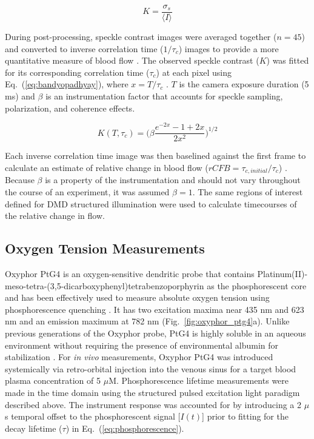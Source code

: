 \documentclass[12pt]{spieman}  %
\begin{document}
\begin{spacing}{2}
\begin{equation}
    \label{eq:speckle_contrast}
    K = \frac{\sigma_{s}}{\langle{I}\rangle}
\end{equation}

During post-processing, speckle contrast images were averaged together ($n = 45$) and converted to inverse correlation time ($1 / \tau_c$) images to provide a more quantitative measure of blood flow \cite{Briers:2001hy}. The observed speckle contrast ($K$) was fitted for its corresponding correlation time ($\tau_{c}$) at each pixel using Eq.~(\ref{eq:bandyopadhyay}), where $x = T / \tau_c$ \cite{Bandyopadhyay:2005bg}. $T$ is the camera exposure duration (5 ms) and $\beta$ is an instrumentation factor that accounts for speckle sampling, polarization, and coherence effects.

\begin{equation}
    \label{eq:bandyopadhyay}
    K(T,\tau_{c}) = \bigg(\beta \frac{e^{-2x} - 1 + 2x}{2x^{2}}\bigg)^{1/2}
\end{equation}

Each inverse correlation time image was then baselined against the first frame to calculate an estimate of relative change in blood flow ($rCFB = \tau_{c,initial}/\tau_c$) \cite{Kazmi:2015du}. Because $\beta$ is a property of the instrumentation and should not vary throughout the course of an experiment, it was assumed $\beta = 1$. The same regions of interest defined for DMD structured illumination were used to calculate timecourses of the relative change in flow.


\subsection{Oxygen Tension Measurements}
Oxyphor PtG4 is an oxygen-sensitive dendritic probe that contains Platinum(II)-meso-tetra-(3,5-dicarboxyphenyl)tetrabenzoporphyrin as the phosphorescent core \cite{Lebedev:2009cf,Esipova:2011hi} and has been effectively used to measure absolute oxygen tension using phosphorescence quenching \cite{Zhang:2013cd,Holt:2014cy}. It has two excitation maxima near 435 nm and 623 nm and an emission maximum at 782 nm (Fig.~\ref{fig:oxyphor_ptg4}a). Unlike previous generations of the Oxyphor probe, PtG4 is highly soluble in an aqueous environment without requiring the presence of environmental albumin for stabilization \cite{Esipova:2011hi}. For \textit{in vivo} measurements, Oxyphor PtG4 was introduced systemically via retro-orbital injection into the venous sinus for a target blood plasma concentration of 5 $\mu$M. Phosphorescence lifetime measurements were made in the time domain using the structured pulsed excitation light paradigm described above. The instrument response was accounted for by introducing a 2 $\mu$s temporal offset to the phosphorescent signal [$I(t)$] prior to fitting for the decay lifetime ($\tau$) in Eq.~(\ref{eq:phosphorescence}).


\end{spacing}
\end{document}
